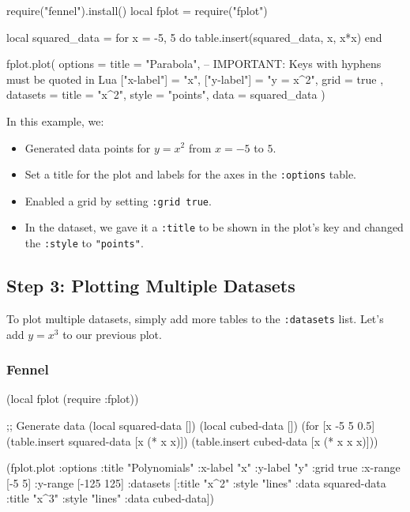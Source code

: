\documentclass[12pt, letterpaper]{article}
\begin{document}
	\begin{luacode}
require("fennel").install()
local fplot = require("fplot")

local squared_data = {}
for x = -5, 5 do
table.insert(squared_data, {x, x*x})
end

fplot.plot({
	options = {
		title = "Parabola",
		-- IMPORTANT: Keys with hyphens must be quoted in Lua
		["x-label"] = "x",
		["y-label"] = "y = x^2",
		grid = true
	},
	datasets = {
		{
			title = "x^2",
			style = "points",
			data = squared_data
		}
	}
})
	\end{luacode}
	
	In this example, we:
	\begin{itemize}
		\item Generated data points for $y = x^2$ from $x = -5$ to $5$.
		\item Set a title for the plot and labels for the axes in the \texttt{:options} table.
		\item Enabled a grid by setting \texttt{:grid true}.
		\item In the dataset, we gave it a \texttt{:title} to be shown in the plot's key and changed the \texttt{:style} to \texttt{"points"}.
	\end{itemize}
	
	\subsection{Step 3: Plotting Multiple Datasets}
	
	To plot multiple datasets, simply add more tables to the \texttt{:datasets} list. Let's add $y = x^3$ to our previous plot.
	
	\subsubsection*{Fennel}
	
	\begin{fennelcode}
(local fplot (require :fplot))

;; Generate data
(local squared-data [])
(local cubed-data [])
(for [x -5 5 0.5]
(table.insert squared-data [x (* x x)])
(table.insert cubed-data [x (* x x x)]))

(fplot.plot
{:options {:title "Polynomials"
		:x-label "x"
		:y-label "y"
		:grid true
		:x-range [-5 5]
		:y-range [-125 125]}
	:datasets [{:title "x^2" :style "lines" :data squared-data}
	{:title "x^3" :style "lines" :data cubed-data}]})
	\end{fennelcode}
	
\end{document}
